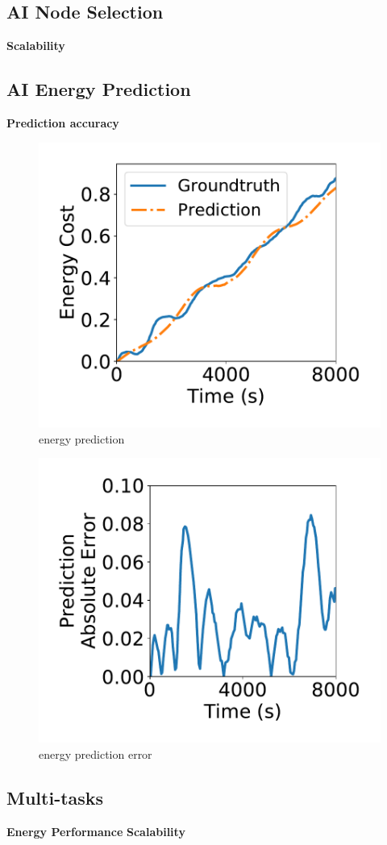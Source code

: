\subsection{AI Node Selection}
\textbf{Scalability}

\subsection{AI Energy Prediction}
\textbf{Prediction accuracy}
\begin{figure}[htbp]
	\centering
	\includegraphics[width=.85\columnwidth]{Figure/energy_pred}
	\vspace{-0.1in}
	\caption{energy prediction}
	\label{energy_pred}
	\vspace{-0.2in}
\end{figure}
\begin{figure}[htbp]
	\centering
	\includegraphics[width=.85\columnwidth]{Figure/energy_pred_err}
	\vspace{-0.1in}
	\caption{energy prediction error}
	\label{energy_pred_err}
	\vspace{-0.2in}
\end{figure}

\subsection{Multi-tasks}
\textbf{Energy Performance}
\textbf{Scalability}


